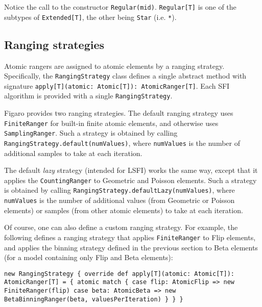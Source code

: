 Notice the call to the constructor \texttt{Regular(mid)}. \texttt{Regular[T]} is one of the subtypes of \texttt{Extended[T]}, the other being \texttt{Star} (i.e. \texttt{*}).

\subsection{Ranging strategies}

Atomic rangers are assigned to atomic elements by a ranging strategy. Specifically, the \texttt{RangingStrategy} class defines a single abstract method with signature \texttt{apply[T](atomic: Atomic[T]): AtomicRang\-er[T]}. Each SFI algorithm is provided with a single \texttt{RangingStrategy}.

Figaro provides two ranging strategies. The default ranging strategy uses \texttt{FiniteRanger} for built-in finite atomic elements, and otherwise uses \texttt{SamplingRanger}. Such a strategy is obtained by calling \texttt{RangingStrategy.default(numValues)}, where \texttt{numValues} is the number of additional samples to take at each iteration.

The default \textit{lazy} strategy (intended for LSFI) works the same way, except that it applies the \texttt{CountingRanger} to Geometric and Poisson elements. Such a strategy is obtained by calling \texttt{RangingStrategy.def\-aultLazy(numValues)}, where \texttt{numValues} is the number of additional values (from Geometric or Poisson elements) or samples (from other atomic elements) to take at each iteration.

Of course, one can also define a custom ranging strategy. For example, the following defines a ranging strategy that applies \texttt{FiniteRanger} to Flip elements, and applies the binning strategy defined in the previous section to Beta elements (for a model containing only Flip and Beta elements):

\begin{flushleft}
\texttt{new RangingStrategy \{
\newline\tab  override def apply[T](atomic: Atomic[T]):
\newline\tab\tab    AtomicRanger[T] = \{
\newline\tab\tab    atomic match \{
\newline\tab\tab\tab      case flip: AtomicFlip =>
\newline\tab\tab\tab\tab        new FiniteRanger(flip)
\newline\tab\tab\tab      case beta: AtomicBeta =>
\newline\tab\tab\tab\tab        new BetaBinningRanger(beta, valuesPerIteration)
\newline\tab\tab    \}
\newline\tab  \}
\newline\}
}
\end{flushleft}

